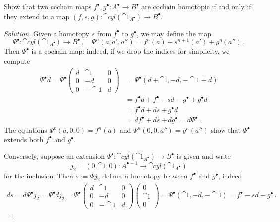 \begin{exercise!}\label{cyl-criterion}
    Show that two cochain maps 
    $f^{\bullet}, g^{\bullet} : A^{\bullet} \to B^{\bullet}$
    are cochain homotopic if and only if
    they extend to a map $(f,s,g) : \cat{cyl}(\cat{1}_{A^{\bullet}}) \to B^{\bullet}$.
    \begin{proof}[Solution]
        Given a homotopy $s$ from $f^{\bullet}$ to $g^{\bullet}$,
        we may define the map
        \begin{equation*}
            \Psi^{\bullet} : \cat{cyl}(\cat{1}_{A^{\bullet}}) \longrightarrow
            B^{\bullet}\,, \quad
            \Psi^{n}(a, a', a'') = f^{n}(a) + s^{n+1}(a') + g^{n}(a'')\,.
        \end{equation*}
        Then $\Psi^{\bullet}$ is a cochain map:
        indeed, if we drop the indices for simplicity,
        we compute
        \begin{align*}
            \Psi^{\bullet} d
            = \Psi^{\bullet}
            \begin{pmatrix}
            d & \cat{1} & 0 \\
            0 & -d & 0 \\
            0 & -\cat{1} & d
            \end{pmatrix}
            &= \Psi^{\bullet}(d + \cat{1}, -d, -\cat{1}+d) \\
            &= f^{\bullet}d + f^{\bullet} - sd - g^{\bullet} + g^{\bullet} d \\
            &= f^{\bullet}d + ds + g^{\bullet} d \\
            &= df^{\bullet} + ds + dg^{\bullet} 
            =d \Psi^{\bullet}\,.
        \end{align*}
        The equations $\Psi^{n}(a, 0, 0) = f^{n}(a)$ and
        $\Psi^{n}(0, 0, a'') = g^{n}(a'')$ show that $\Psi^{\bullet}$
        extends both $f^{\bullet}$ and $g^{\bullet}$.

        Conversely, suppose an extension $\Psi^{\bullet} : \cat{cyl}(\cat{1}_{A^{\bullet}}) \to B^{\bullet}$ is given and write
        $$j_{2} = (0, \cat{1},0) : A^{\bullet+1} \to \cat{cyl}(\cat{1}_{A^{\bullet}})$$
        for the inclusion. Then $s := \Psi j_{2}$ defines a homotopy
        between $f^{\bullet}$ and $g^{\bullet}$, indeed
        \begin{align*}
            ds = d\Psi^{\bullet}j_{2} 
            = \Psi^{\bullet} d j_{2}
            = \Psi^{\bullet} 
            \begin{pmatrix}
            d & \cat{1} & 0 \\
            0 & -d & 0 \\
            0 & -\cat{1} & d
            \end{pmatrix}
            \begin{pmatrix}
            0 \\ \cat{1} \\ 0 
            \end{pmatrix}
            = \Psi^{\bullet}(\cat{1}, -d, -\cat{1})
            = f^{\bullet} - sd - g^{\bullet}\,.
        \end{align*}
    \end{proof}
\end{exercise!}

